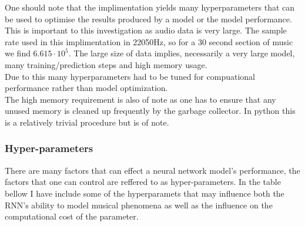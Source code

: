\documentclass{article}
\begin{document}
One should note that the implimentation yields many hyperparameters that can be used to optimise the results produced by a model or the model performance. This is important to this investigation as audio data is very large. The sample rate used in this implimentation in 22050Hz, so for a 30 second section of music we find $6.615\cdot 10^{5}$. The large size of data implies, necessarily a very large model, many training/prediction steps and high memory usage. \\
Due to this many hyperparameters had to be tuned for compuational performance rather than model optimization. \\
The high memory requirement is also of note as one has to ensure that any unused memory is cleaned up frequently by the garbage collector. In python this is a relatively trivial procedure but is of note. 

\subsubsection{Hyper-parameters}
There are many factors that can effect a neural network model's performance, the factors that one can control are reffered to as hyper-parameters. In the table bellow I have include some of the hyperparamets that may influence both the RNN's ability to model musical phenomena as well as the influence on the computational cost of the parameter.
\end{document}
